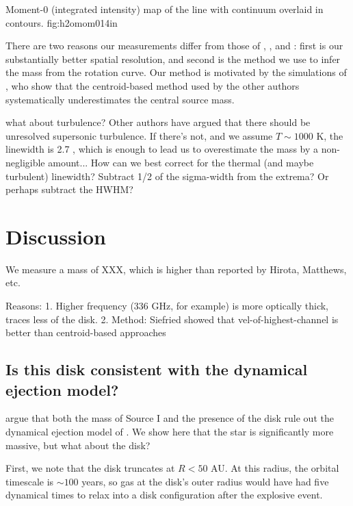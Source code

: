 \documentclass[twocolumn]{aastex61}
\begin{document}
{Moment-0 (integrated intensity) map of the \water line with continuum overlaid in contours.}
{fig:h2omom0}{1}{4in}

There are two reasons our measurements differ from those of \citet{Plambeck2016a},
\citet{Hirota2014a}, and \citet{Matthews2010a}: first is our substantially better
spatial resolution, and second is the method we use to infer the mass from the
rotation curve.  Our method is motivated by the simulations of \citet{Seifried2016a},
who show that the centroid-based method used by the other authors systematically
underestimates the central source mass.

what about turbulence?  Other authors have argued that there should be unresolved
supersonic turbulence.  If there's not, and we assume $T\sim1000$ K, the
linewidth is 2.7 \kms, which is enough to lead us to overestimate the mass by a
non-negligible amount...  {\color{red} How can we best correct for the thermal
(and maybe turbulent) linewidth?  Subtract 1/2 of the sigma-width from the extrema?
Or perhaps subtract the HWHM?}


\section{Discussion}
We measure a mass of XXX, which is higher than reported by Hirota, Matthews, etc.

Reasons:
1. Higher frequency (336 GHz, for example) is more optically thick, traces less
of the disk.
2. Method: Siefried showed that vel-of-highest-channel is better than centroid-based
approaches

\subsection{Is this disk consistent with the dynamical ejection model?}
\citet{Plambeck2016a} argue that both the mass of Source I and the presence of the disk
rule out the dynamical ejection model of \citet{Bally2011a}.  We show here that
the star is significantly more massive, but what about the disk?

First, we note that the disk truncates at $R<50$ AU.  At this radius, the
orbital timescale is $\sim100$ years, so gas at the disk's outer radius would
have had five dynamical times to relax into a disk configuration after the
explosive event.


\end{document}
